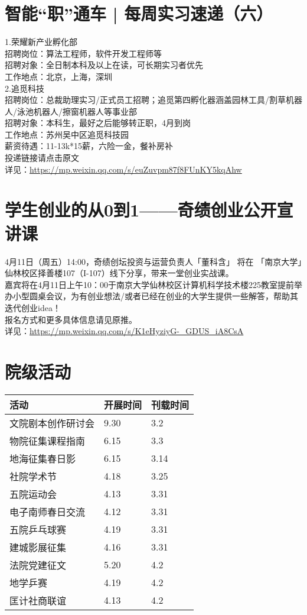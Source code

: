 \documentclass[letterpaper, 12pt]{article}
\begin{document}
\begin{multicols}{2}
\section{智能“职”通车 | 每周实习速递（六）}
1.荣耀新产业孵化部
\\招聘岗位：算法工程师，软件开发工程师等
\\招聘对象：全日制本科及以上在读，可长期实习者优先
\\工作地点：北京，上海，深圳
\\2.追觅科技
\\招聘岗位：总裁助理实习/正式员工招聘；追觅第四孵化器涵盖园林工具/割草机器人/泳池机器人/擦窗机器人等事业部
\\招聘对象：本科生，最好之后能够转正职，4月到岗
\\工作地点：苏州吴中区追觅科技园
\\薪资待遇：11-13k*15薪，六险一金，餐补房补
\\投递链接请点击原文
\\详见：\url{https://mp.weixin.qq.com/s/euZuvpm87f8FUnKY5kqAhw}

\section{学生创业的从0到1——奇绩创业公开宣讲课}
4月11日（周五）14:00，奇绩创坛投资与运营负责人「董科含」 将在 「南京大学」仙林校区择善楼107（I-107）线下分享，带来一堂创业实战课。
\\嘉宾将在4月11日上午10：00于南京大学仙林校区计算机科学技术楼225教室提前举办小型圆桌会议，为有创业想法/或者已经在创业的大学生提供一些解答，帮助其迭代创业idea！
\\报名方式和更多具体信息请见原推。
\\详见：\url{https://mp.weixin.qq.com/s/K1eHyziyG-_GDUS_iA8CsA}


\section{院级活动}
\begin{tabular}{|>{\centering\arraybackslash}m{}|m{}|m{}|}
\hline
    活动 & 开展时间 & 刊载时间\\
    \hline\hline
    文院剧本创作研讨会 & 9.30 & 3.2\\
    物院征集课程指南 & 6.15 & 3.3\\
    地海征集春日影 & 6.15 & 3.14\\
    社院学术节 & 4.18 & 3.25\\
    五院运动会 & 4.13 & 3.31\\
    电子南师春日交流 & 4.12 & 3.31\\
    五院乒乓球赛 & 4.19 & 3.31\\
    建城影展征集 & 4.16 & 3.31\\
    法院党建征文 & 5.20 & 4.2\\
    地学乒赛 & 4.19 & 4.2\\
    匡计社商联谊 & 4.13 & 4.2\\
    

\end{tabular}
\end{multicols}
\end{document}
